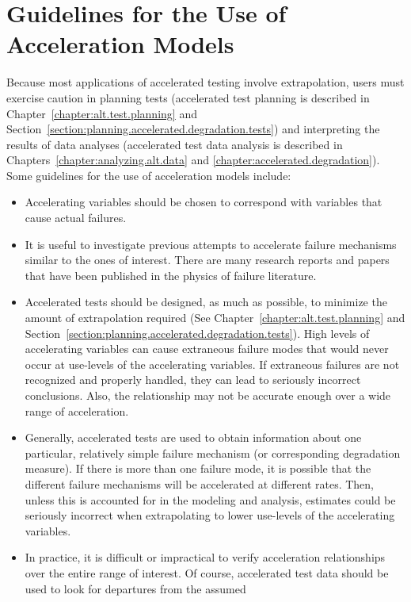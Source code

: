  
\section{Guidelines for the Use of Acceleration Models}

Because most applications of accelerated testing involve
extrapolation, users must exercise caution in planning tests
(accelerated test planning is described in
Chapter~\ref{chapter:alt.test.planning} and
Section~\ref{section:planning.accelerated.degradation.tests}) and
interpreting the results of data analyses (accelerated test data
analysis is described in Chapters~\ref{chapter:analyzing.alt.data}
and
\ref{chapter:accelerated.degradation}). Some guidelines for the use of
acceleration models include:
\begin{itemize}
\item
Accelerating variables should be chosen to correspond with
variables that cause actual failures.
\item
It is useful to
investigate previous attempts to accelerate failure mechanisms similar to
the ones of interest. There are many research reports and
papers that have been published in the physics of
failure literature.
\item
Accelerated tests should be designed, as much as possible, to minimize
the amount of extrapolation required (See
Chapter~\ref{chapter:alt.test.planning} and
Section~\ref{section:planning.accelerated.degradation.tests}).
High levels of accelerating variables can cause extraneous failure modes
that would never occur at use-levels of the accelerating variables.  If
extraneous failures are not recognized and properly handled, they can lead 
to seriously incorrect conclusions. Also, the relationship may not be
accurate enough over a wide range of acceleration.
\item
Generally, accelerated tests are used to obtain information about one
particular, relatively simple failure mechanism (or corresponding
degradation measure).  If there is more than one failure mode, it is
possible that the different failure mechanisms will be accelerated at
different rates. Then, unless this is accounted for in the modeling and
analysis, estimates could be seriously incorrect when extrapolating
to lower use-levels of the accelerating variables.
\item
In practice, it is difficult or impractical to verify acceleration
relationships over the entire range of interest.  Of course, accelerated
test data should be used to look for departures from the assumed

\end{itemize}
